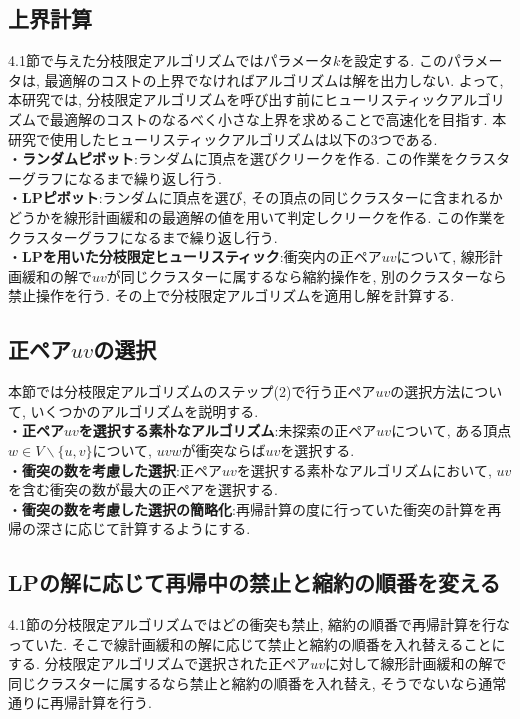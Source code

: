 \documentclass[10pt,a4j,twocolumn, dvipdfmx]{bxjsarticle}
\begin{document}
\subsection{上界計算}
4.1節で与えた分枝限定アルゴリズムではパラメータ$k$を設定する.
このパラメータは, 最適解のコストの上界でなければアルゴリズムは解を出力しない.
よって, 本研究では, 分枝限定アルゴリズムを呼び出す前にヒューリスティックアルゴリズムで最適解のコストのなるべく小さな上界を求めることで高速化を目指す.
本研究で使用したヒューリスティックアルゴリズムは以下の3つである.\\
・\textbf{ランダムピボット}:ランダムに頂点を選びクリークを作る. この作業をクラスターグラフになるまで繰り返し行う.\\
・\textbf{LPピボット}:ランダムに頂点を選び, その頂点の同じクラスターに含まれるかどうかを線形計画緩和の最適解の値を用いて判定しクリークを作る. この作業をクラスターグラフになるまで繰り返し行う.\\
・\textbf{LPを用いた分枝限定ヒューリスティック}:衝突内の正ペア$uv$について, 線形計画緩和の解で$uv$が同じクラスターに属するなら縮約操作を, 別のクラスターなら禁止操作を行う.
その上で分枝限定アルゴリズムを適用し解を計算する.
\subsection{正ペア$uv$の選択}
本節では分枝限定アルゴリズムのステップ(2)で行う正ペア$uv$の選択方法について, いくつかのアルゴリズムを説明する.\\
・\textbf{正ペア$uv$を選択する素朴なアルゴリズム}:未探索の正ペア$uv$について, ある頂点$w \in V \backslash \{u,v\}$について, $uvw$が衝突ならば$uv$を選択する.\\
・\textbf{衝突の数を考慮した選択}:正ペア$uv$を選択する素朴なアルゴリズムにおいて, $uv$を含む衝突の数が最大の正ペアを選択する.\\
・\textbf{衝突の数を考慮した選択の簡略化}:再帰計算の度に行っていた衝突の計算を再帰の深さに応じて計算するようにする.

\subsection{LPの解に応じて再帰中の禁止と縮約の順番を変える}
4.1節の分枝限定アルゴリズムではどの衝突も禁止, 縮約の順番で再帰計算を行なっていた.
そこで線計画緩和の解に応じて禁止と縮約の順番を入れ替えることにする.
分枝限定アルゴリズムで選択された正ペア$uv$に対して線形計画緩和の解で同じクラスターに属するなら禁止と縮約の順番を入れ替え, そうでないなら通常通りに再帰計算を行う.
\end{document}
